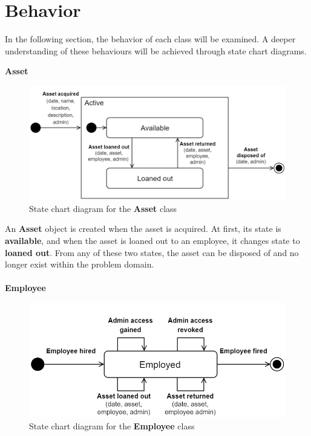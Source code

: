 \section{Behavior} \label{sc:behavoir}
In the following section, the behavior of each class will be examined. A deeper understanding of these behaviours will be achieved through state chart diagrams.

\large{\textbf{Asset}}
\begin{figure}[H]
    \centering
    \includegraphics[width=1\textwidth]{figures/StateChart_Asset.png}
    \caption{State chart diagram for the \textbf{Asset} class}
    \label{fig:asset_statechart}
\end{figure}

An \textbf{Asset} object is created when the asset is acquired. At first, its state is \textbf{available}, and when the asset is loaned out to an employee, it changes state to \textbf{loaned out}. From any of these two states, the asset can be disposed of and no longer exist within the problem domain.
\\\\

\large{\textbf{Employee}}
\begin{figure}[H]
    \centering
    \includegraphics[width=1\textwidth]{figures/StateChart_Employee.png}
    \caption{State chart diagram for the \textbf{Employee} class}
    \label{fig:employee_statechart}
\end{figure}

